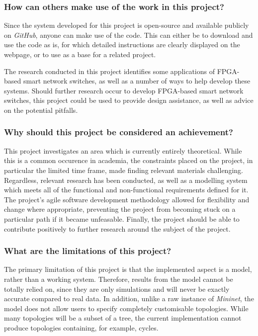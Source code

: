 \subsubsection{How can others make use of the work in this project?}
Since the system developed for this project is open-source and available publicly on \textit{GitHub}, anyone can make use of the code. This can either be to download and use the code as is, for which detailed instructions are clearly displayed on the webpage, or to use as a base for a related project.

The research conducted in this project identifies some applications of FPGA-based smart network switches, as well as a number of ways to help develop these systems. Should further research occur to develop FPGA-based smart network switches, this project could be used to provide design assistance, as well as advice on the potential pitfalls.

\subsubsection{Why should this project be considered an achievement?}
This project investigates an area which is currently entirely theoretical. While this is a common occurence in academia, the constraints placed on the project, in particular the limited time frame, made finding relevant materials challenging. Regardless, relevant research has been conducted, as well as a modelling system which meets all of the functional and non-functional requirements defined for it. The project's agile software development methodology allowed for flexibility and change where appropriate, preventing the project from becoming stuck on a particular path if it became unfeasable. Finally, the project should be able to contribute positively to further research around the subject of the project.

\subsubsection{What are the limitations of this project?}
The primary limitation of this project is that the implemented aspect is a model, rather than a working system. Therefore, results from the model cannot be totally relied on, since they are only simulations and will never be exactly accurate compared to real data. In addition, unlike a raw instance of \textit{Mininet}, the model does not allow users to specify completely customisable topologies. While many topologies will be a subset of a tree, the current implementation cannot produce topologies containing, for example, cycles.

